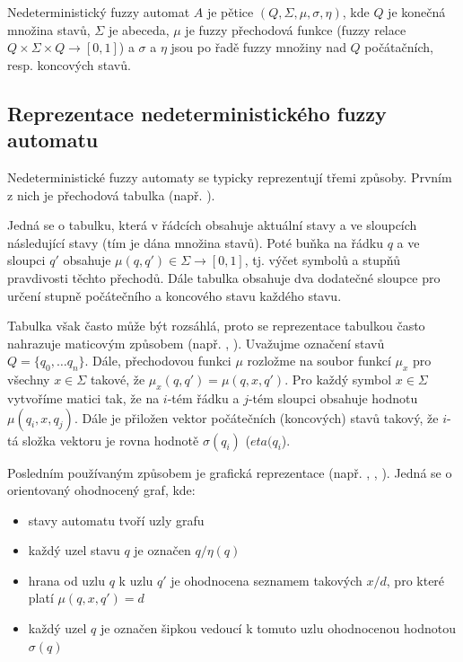 \documentclass[a4paper,10pt]{article}
\begin{document}
\begin{definition}\label{def-ZaklDefNedFuzzAut}
 Nedeterministický fuzzy automat $A$ je pětice $(Q, \Sigma, \mu, \sigma, \eta)$, kde $Q$ je konečná množina stavů, $\Sigma$ je abeceda, $\mu$ je fuzzy přechodová funkce (fuzzy relace $Q \times \Sigma \times Q \rightarrow [0, 1]$) a $\sigma$ a $\eta$ jsou po řadě fuzzy množiny nad $Q$ počátačních, resp. koncových stavů.
\end{definition}

\subsection{Reprezentace nedeterministického fuzzy automatu}
Nedeterministické fuzzy automaty se typicky reprezentují třemi způsoby. Prvním z nich je přechodová tabulka (např. \cite{DooKre-NewDirFuzzAut}). 

Jedná se o tabulku, která v řádcích obsahuje aktuální stavy a ve sloupcích následující stavy (tím je dána množina stavů). Poté buňka na řádku $q$ a ve sloupci $q'$ obsahuje $\mu(q, q') \in \Sigma \rightarrow [0, 1]$, tj. výčet symbolů a stupňů pravdivosti těchto přechodů. Dále tabulka obsahuje dva dodatečné sloupce pro určení stupně počátečního a koncového stavu každého stavu.

Tabulka však často může být rozsáhlá, proto se reprezentace tabulkou často nahrazuje maticovým způsobem (např. \cite{SnaKepAbrHas-AproxStriMatchFuzzAut}, \cite{StaCir-ConsFuzzAutFuzzRegExp}). Uvažujme označení stavů $Q = \{ q_0, \dots q_n \}$. Dále, přechodovou funkci $\mu$ rozložme na soubor funkcí $\mu_x$ pro všechny $x \in \Sigma$ takové, že $\mu_x(q, q') = \mu(q, x, q')$. Pro každý symbol $x \in \Sigma$ vytvoříme matici tak, že na $i$-tém řádku a $j$-tém sloupci obsahuje hodnotu $\mu(q_i, x, q_j)$. Dále je přiložen vektor počátečních (koncových) stavů takový, že $i$-tá složka vektoru je rovna hodnotě $\sigma(q_i)$ ($eta(q_i$).

Posledním používaným způsobem je grafická reprezentace (např. \cite{DooKre-NewDirFuzzAut}, \cite{GonGar-FuzzLangInfRanAccGuzzAutPumLemDetProc}, \cite{StaCir-ConsFuzzAutFuzzRegExp}). Jedná se o orientovaný ohodnocený graf, kde:
\begin{itemize}
 \item stavy automatu tvoří uzly grafu
 \item každý uzel stavu $q$ je označen $q/\eta(q)$
 \item hrana od uzlu $q$ k uzlu $q'$ je ohodnocena seznamem takových $x/d$, pro které platí $\mu(q, x, q') = d$
 \item každý uzel $q$ je označen šipkou vedoucí k tomuto uzlu ohodnocenou hodnotou $\sigma(q)$
\end{itemize}
\end{document}
